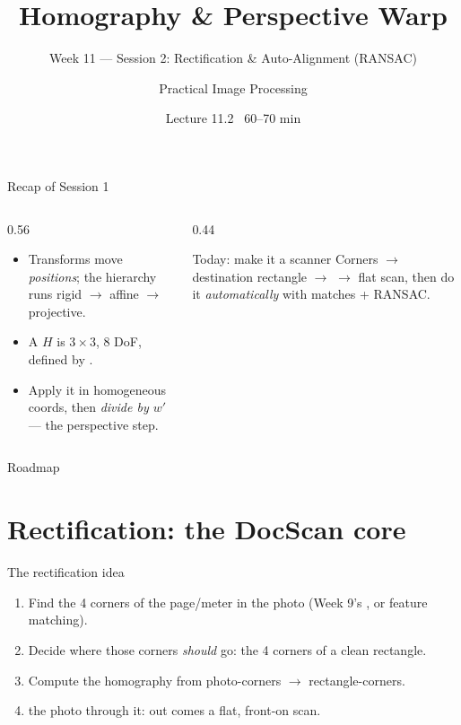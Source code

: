 \documentclass[10pt,aspectratio=169]{beamer}
\title{Homography \& Perspective Warp}
\subtitle{Week 11 — Session 2: Rectification \& Auto-Alignment (RANSAC)}
\author{Practical Image Processing}
\date{Lecture 11.2 \textbullet\ 60--70 min}
\begin{document}
\maketitle

\begin{frame}{Recap of Session 1}
  \begin{columns}[T]
    \begin{column}{0.56\textwidth}
      \begin{itemize}
        \item Transforms move \emph{positions}; the hierarchy runs rigid $\to$ affine $\to$ projective.
        \item A  $H$ is $3\times3$, 8 DoF, defined by .
        \item Apply it in homogeneous coords, then \emph{divide by $w'$} — the perspective step.
      \end{itemize}
    \end{column}
    \begin{column}{0.44\textwidth}
      \begin{alertblock}{Today: make it a scanner}
        Corners $\to$ destination rectangle $\to$  $\to$ flat scan, then do it
        \emph{automatically} with matches + RANSAC.
      \end{alertblock}
    \end{column}
  \end{columns}
\end{frame}

\begin{frame}{Roadmap}\tableofcontents\end{frame}

\section{Rectification: the DocScan core}

\begin{frame}{The rectification idea}
  \begin{enumerate}
    \item Find the 4 corners of the page/meter in the photo (Week 9's , or feature matching).
    \item Decide where those corners \emph{should} go: the 4 corners of a clean rectangle.
    \item Compute the homography from photo-corners $\rightarrow$ rectangle-corners.
    \item {} the photo through it: out comes a flat, front-on scan.
  \end{enumerate}
\end{frame}
\end{document}
